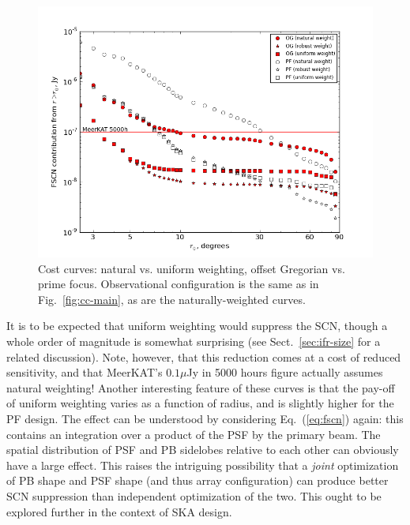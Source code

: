 \documentclass{aa}
\begin{document}
\begin{figure}
  \includegraphics[width=\columnwidth]{cc-mk-nat-vs-uni}
\caption{\label{fig:cc-weights}Cost curves: natural vs. uniform weighting, offset Gregorian vs. prime focus. Observational configuration is the same as in Fig.~\ref{fig:cc-main}, as are the naturally-weighted curves.}
\end{figure}

It is to be expected that uniform weighting would suppress the SCN, though a whole order of magnitude is somewhat surprising (see Sect.~\ref{sec:ifr-size} for a related discussion). Note, however, that this reduction comes at a cost of reduced sensitivity, and that MeerKAT's $0.1\mu$Jy in 5000 hours figure actually assumes natural weighting! Another interesting feature of these curves is that the pay-off of uniform weighting varies as a function of radius, and is slightly higher for the PF design. The effect can be understood by considering  Eq.~(\ref{eq:fscn}) again: this contains an integration over a product of the PSF by the primary beam. The spatial distribution of PSF and PB sidelobes relative to each other can obviously have a large effect. This raises the intriguing possibility that a \emph{joint} optimization of PB shape and PSF shape (and thus array configuration) can produce better SCN suppression than independent optimization of the two. This ought to be explored further in the context of SKA 
design.
\end{document}

